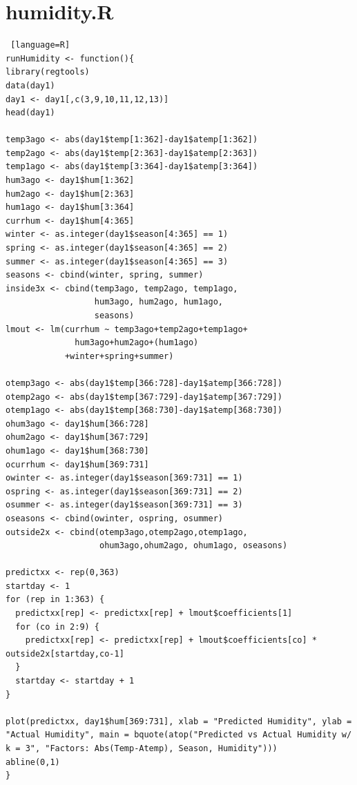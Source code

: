 \documentclass[12pt]{article}
\begin{document}
\section{humidity.R}
\begin{lstlisting} [language=R]
runHumidity <- function(){
library(regtools)
data(day1)
day1 <- day1[,c(3,9,10,11,12,13)]
head(day1)

temp3ago <- abs(day1$temp[1:362]-day1$atemp[1:362])
temp2ago <- abs(day1$temp[2:363]-day1$atemp[2:363])
temp1ago <- abs(day1$temp[3:364]-day1$atemp[3:364])
hum3ago <- day1$hum[1:362]
hum2ago <- day1$hum[2:363]
hum1ago <- day1$hum[3:364]
currhum <- day1$hum[4:365]
winter <- as.integer(day1$season[4:365] == 1)
spring <- as.integer(day1$season[4:365] == 2)
summer <- as.integer(day1$season[4:365] == 3)
seasons <- cbind(winter, spring, summer)
inside3x <- cbind(temp3ago, temp2ago, temp1ago, 
                  hum3ago, hum2ago, hum1ago,
                  seasons)
lmout <- lm(currhum ~ temp3ago+temp2ago+temp1ago+
              hum3ago+hum2ago+(hum1ago)
            +winter+spring+summer)

otemp3ago <- abs(day1$temp[366:728]-day1$atemp[366:728])
otemp2ago <- abs(day1$temp[367:729]-day1$atemp[367:729])
otemp1ago <- abs(day1$temp[368:730]-day1$atemp[368:730])
ohum3ago <- day1$hum[366:728]
ohum2ago <- day1$hum[367:729]
ohum1ago <- day1$hum[368:730]
ocurrhum <- day1$hum[369:731]
owinter <- as.integer(day1$season[369:731] == 1)
ospring <- as.integer(day1$season[369:731] == 2)
osummer <- as.integer(day1$season[369:731] == 3)
oseasons <- cbind(owinter, ospring, osummer)
outside2x <- cbind(otemp3ago,otemp2ago,otemp1ago, 
                   ohum3ago,ohum2ago, ohum1ago, oseasons)

predictxx <- rep(0,363)
startday <- 1
for (rep in 1:363) {
  predictxx[rep] <- predictxx[rep] + lmout$coefficients[1]
  for (co in 2:9) {
    predictxx[rep] <- predictxx[rep] + lmout$coefficients[co] * outside2x[startday,co-1]
  }
  startday <- startday + 1
}

plot(predictxx, day1$hum[369:731], xlab = "Predicted Humidity", ylab = "Actual Humidity", main = bquote(atop("Predicted vs Actual Humidity w/ k = 3", "Factors: Abs(Temp-Atemp), Season, Humidity")))
abline(0,1)
}
\end{lstlisting}
\end{document}
